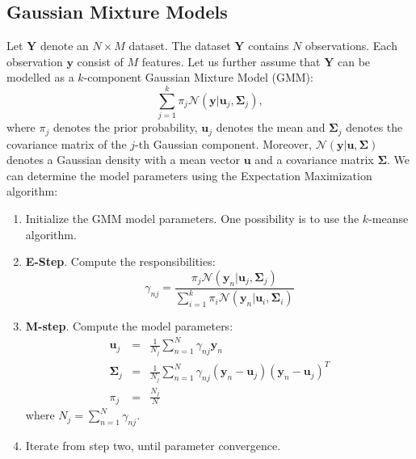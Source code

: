 \documentclass{article}
\begin{document}
\subsection{Gaussian Mixture Models}
Let $\mathbf{Y}$ denote an $N\times M$ dataset. The dataset $\mathbf{Y}$ contains $N$ observations. Each observation $\mathbf{y}$ consist of $M$ features. Let us further assume 
that $\mathbf{Y}$ can be modelled as a $k$-component Gaussian Mixture Model (GMM):
\begin{equation}
\sum_{j=1}^k \pi_j \mathcal{N}(\mathbf{y}|\mathbf{u}_j,\mathbf{\Sigma}_j),
\end{equation}
where $\pi_j$ denotes the prior probability, $\mathbf{u}_j$ denotes the mean and $\mathbf{\Sigma}_j$ denotes the covariance matrix of the $j$-th Gaussian component. Moreover,
$\mathcal{N}(\mathbf{y}|\mathbf{u},\mathbf{\Sigma})$ denotes a Gaussian density with a mean vector $\mathbf{u}$ and a covariance matrix $\mathbf{\Sigma}$.  
We can determine the model parameters using the Expectation Maximization algorithm:
\begin{enumerate}
 \item Initialize the GMM model parameters. One possibility is to use the $k$-meanse algorithm.
 \item \textbf{E-Step}. Compute the responsibilities:
 \begin{equation}
  \gamma_{nj} = \frac{\pi_j\mathcal{N}(\mathbf{y}_n|\mathbf{u}_j,\mathbf{\Sigma}_j)}{\sum_{i=1}^{k}\pi_i\mathcal{N}(\mathbf{y}_n|\mathbf{u}_i,\mathbf{\Sigma}_i)}
 \end{equation}
 \item \textbf{M-step}. Compute the model parameters:
 \begin{eqnarray}
  \mathbf{u}_j &=& \frac{1}{N_j} \sum_{n=1}^{N} \gamma_{nj}\mathbf{y}_n\\
  \mathbf{\Sigma}_j &=& \frac{1}{N_j} \sum_{n=1}^{N} \gamma_{nj} (\mathbf{y}_n-\mathbf{u}_j)(\mathbf{y}_n-\mathbf{u}_j)^T\\
  \pi_j &=& \frac{N_j}{N}
 \end{eqnarray}
 where $N_j = \sum_{n=1}^N \gamma_{nj}$.
 \item Iterate from step two, until parameter convergence.
\end{enumerate}
\end{document}
